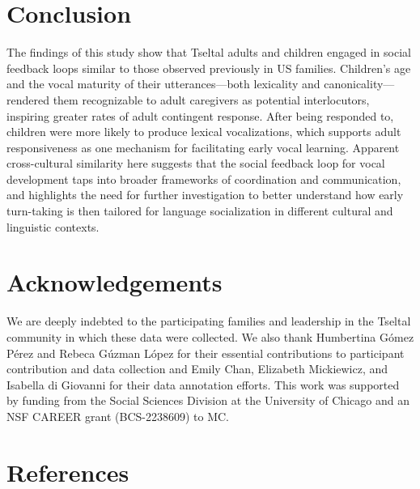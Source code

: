 \documentclass[
  man]{apa6}
\begin{document}
\hypertarget{conclusion}{%
\section{Conclusion}\label{conclusion}}

The findings of this study show that Tseltal adults and children engaged in social feedback loops similar to those observed previously in US families. Children's age and the vocal maturity of their utterances---both lexicality and canonicality---rendered them recognizable to adult caregivers as potential interlocutors, inspiring greater rates of adult contingent response. After being responded to, children were more likely to produce lexical vocalizations, which supports adult responsiveness as one mechanism for facilitating early vocal learning. Apparent cross-cultural similarity here suggests that the social feedback loop for vocal development taps into broader frameworks of coordination and communication, and highlights the need for further investigation to better understand how early turn-taking is then tailored for language socialization in different cultural and linguistic contexts.

\hypertarget{acknowledgements}{%
\section{Acknowledgements}\label{acknowledgements}}

We are deeply indebted to the participating families and leadership in the Tseltal community in which these data were collected. We also thank Humbertina Gómez Pérez and Rebeca Gúzman López for their essential contributions to participant contribution and data collection and Emily Chan, Elizabeth Mickiewicz, and Isabella di Giovanni for their data annotation efforts. This work was supported by funding from the Social Sciences Division at the University of Chicago and an NSF CAREER grant (BCS-2238609) to MC.

\newpage

\hypertarget{references}{%
\section*{References}\label{references}}
\end{document}
